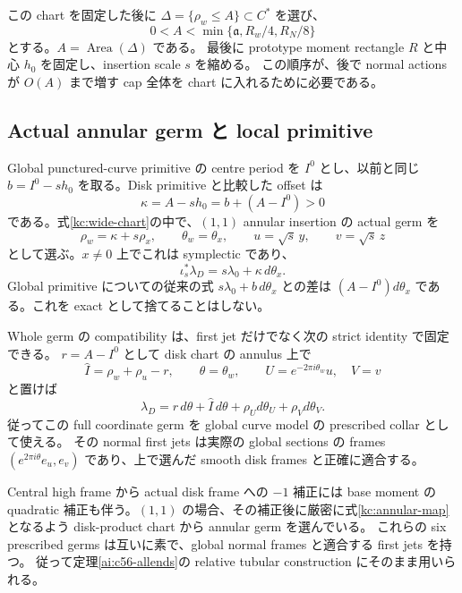 この chart を固定した後に $\Delta=\{\rho_w\le A\}\subset C^*$ を選び、
\begin{equation}\label{kc:base-bound}
 0<A<\min\{\mathfrak a,R_w/4,R_N/8\}
\end{equation}
とする。$A=\operatorname{Area}(\Delta)$ である。
最後に prototype moment rectangle $R$ と中心 $h_0$ を固定し、insertion scale $s$ を縮める。
この順序が、後で normal actions が $O(A)$ まで増す cap 全体を chart に入れるために必要である。

\subsection{Actual annular germ と local primitive}

Global punctured-curve primitive の centre period を $I^0$ とし、以前と同じ
$b=I^0-sh_0$ を取る。Disk primitive と比較した offset は
\[
 \kappa=A-sh_0=b+(A-I^0)>0
\]
である。式\eqref{kc:wide-chart}の中で、$(1,1)$ annular insertion の actual germ を
\begin{equation}\label{kc:annular-map}
 \rho_w=\kappa+s\rho_x,\qquad \theta_w=\theta_x,
 \qquad u=\sqrt s\,y,\qquad v=\sqrt s\,z
\end{equation}
として選ぶ。$x\ne0$ 上でこれは symplectic であり、
\begin{equation}\label{kc:local-primitive}
 \iota_s^*\lambda_D=s\lambda_0+\kappa\,d\theta_x.
\end{equation}
Global primitive についての従来の式 $s\lambda_0+b\,d\theta_x$ との差は
$(A-I^0)d\theta_x$ である。これを exact として捨てることはしない。

Whole germ の compatibility は、first jet だけでなく次の strict identity で固定できる。
$r=A-I^0$ として disk chart の annulus 上で
\[
 \widehat I=\rho_w+\rho_u-r,\qquad \theta=\theta_w,
 \qquad U=e^{-2\pi i\theta_w}u,\quad V=v
\]
と置けば
\[
 \lambda_D=r\,d\theta+
 \widehat I\,d\theta+\rho_Ud\theta_U+\rho_Vd\theta_V.
\]
従ってこの full coordinate germ を global curve model の prescribed collar として使える。
その normal first jets は実際の global sections の frames
$(e^{2\pi i\theta}e_u,e_v)$ であり、上で選んだ smooth disk frames と正確に適合する。

Central high frame から actual disk frame への $-1$ 補正には base moment の quadratic
補正も伴う。$(1,1)$ の場合、その補正後に厳密に式\eqref{kc:annular-map}となるよう
disk-product chart から annular germ を選んでいる。
これらの six prescribed germs は互いに素で、global normal frames と適合する first jets を持つ。
従って定理\ref{ai:c56-allends}の relative tubular construction にそのまま用いられる。

